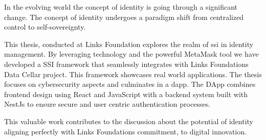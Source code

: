 \sommario
In the evolving world the concept of identity is going through a significant change. The concept of identity undergoes a paradigm shift from centralized control to 
self-sovereignty. 

This thesis, conducted at Links Foundation explores the realm of \gls{ssi} in identity management. By leveraging technology and the powerful MetaMask tool we have developed 
a SSI framework that seamlessly integrates with Links Foundations Data Cellar project. This framework showcases real world applications. The thesis focuses on cybersecurity 
aspects and culminates in a \gls{dapp}. The DApp combines frontend design using React and JavaScript with a backend system built with NestJs to ensure secure and user 
centric authentication processes. 

This valuable work contributes to the discussion about the potential of identity aligning perfectly with Links Foundations commitment, to digital innovation.